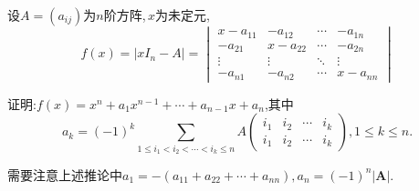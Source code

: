 \documentclass[../../main.tex]{subfiles}
\begin{document}
\begin{corollary}\label{corollary:特征多项式系数与矩阵子式的关系}
设\(A=(a_{ij})\)为\(n\)阶方阵,\(\,x\)为未定元,
\[
f(x)=\vert xI_n - A\vert = 
\begin{vmatrix}
x - a_{11} & -a_{12} & \cdots & -a_{1n} \\
-a_{21} & x - a_{22} & \cdots & -a_{2n} \\
\vdots & \vdots & \ddots & \vdots \\
-a_{n1} & -a_{n2} & \cdots & x - a_{nn}
\end{vmatrix}
\]

证明:\(f(x)=x^n + a_1x^{n - 1}+ \cdots + a_{n - 1}x + a_n\),其中
\[
a_k=(-1)^k \sum_{1\leqslant  i_1 < i_2<\cdots <i_k\leqslant  n} A
\begin{pmatrix}
i_1 & i_2 & \cdots & i_k \\
i_1 & i_2 & \cdots & i_k
\end{pmatrix}, 1\leqslant  k\leqslant  n.
\]
\end{corollary}
\begin{note}
需要注意上述推论中$a_1=-(a_{11}+a_{22}+\cdots+a_{nn}),a_n=\left( -1 \right) ^n\left| \boldsymbol{A} \right|.$
\end{note}
\end{document}

